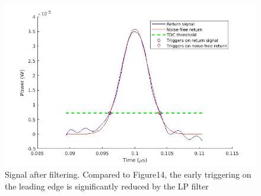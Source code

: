 \begin{figure}[t!p]
\centering
\includegraphics[width=.8\textwidth]{figures/chapter7_TDC/signal_TOT_d_15_trigger_filt.jpg}
\caption{Signal after filtering. Compared to Figure14, the early triggering on the leading edge is significantly reduced by the LP filter}
\label{fig:TDC_earlyTrigger_filt}
\end{figure}